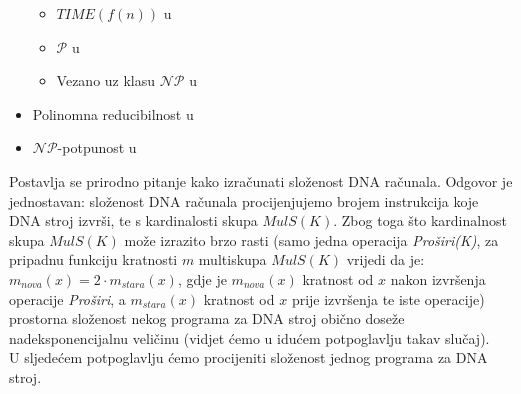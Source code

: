 \documentclass[12pt, a4paper]{book}
\begin{document}
\begin{spacing}{1.5}
\begin{itemize}
 \begin{itemize}
 	\item $TIME(f(n))$ u \cite[str. ~251]{Sipser}
 	\item $\mathcal{P}$  u \cite[str. ~258]{Sipser}
 	\item Vezano uz klasu $\mathcal{NP}$ u \cite[str. ~265-267]{Sipser}
 \end{itemize} 
 	\item Polinomna reducibilnost u \cite[str. ~272]{Sipser}
 	\item $\mathcal{NP}$-potpunost u \cite[str. ~276]{Sipser}
\end{itemize}

Postavlja se prirodno pitanje kako izračunati složenost DNA računala. Odgovor je jednostavan: složenost DNA računala procijenjujemo brojem instrukcija koje DNA stroj izvrši, te s kardinalosti skupa $MulS(K)$. Zbog toga što kardinalnost skupa $MulS(K)$ može izrazito brzo rasti (samo jedna operacija \textit{Proširi(K)}, za pripadnu funkciju kratnosti $m$ multiskupa $MulS(K)$ vrijedi da je: $m_{nova}(x)=2\cdot m_{stara}(x)$, gdje je $m_{nova}(x)$ kratnost od $x$ nakon izvršenja operacije \textit{Proširi}, a $m_{stara}(x)$ kratnost od $x$ prije izvršenja te iste operacije) prostorna složenost nekog programa za DNA stroj obično doseže nadeksponencijalnu veličinu (vidjet ćemo u idućem potpoglavlju takav slučaj). \\
U sljedećem potpoglavlju ćemo procijeniti složenost jednog programa za DNA stroj.

\end{spacing}
\end{document}
